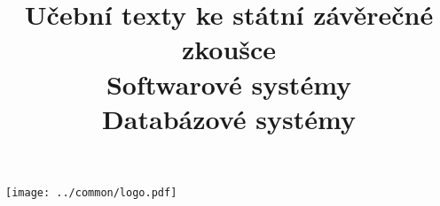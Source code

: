 \clearpage

\clearpage

\title{\LARGE Učební texty ke státní závěrečné zkoušce \\ Softwarové systémy \\ Databázové systémy}




\maketitle

\vspace{10mm}
\begin{center}
\texttt{[image: ../common/logo.pdf]}
\end{center} 

\clearpage

\clearpage

\tableofcontents








